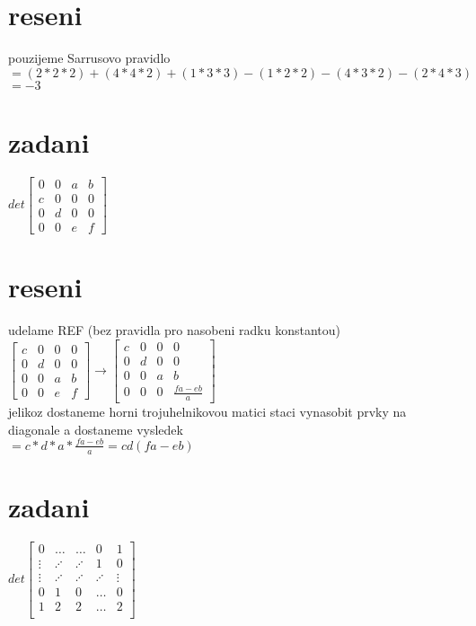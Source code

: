 \documentclass[a4paper]{article}
\begin{document}
\section*{reseni}
pouzijeme Sarrusovo pravidlo\\
$
= (2*2*2) + (4*4*2) + (1*3*3) - (1*2*2) - (4*3*2) - (2*4*3)
$\\
$= -3$



\section*{zadani}
$det
\left[ \begin{matrix} 
	0 & 0 & a & b \\
	c & 0 & 0 & 0 \\
	0 & d & 0 & 0 \\
	0 & 0 & e & f
\end{matrix} \right]
$

\section*{reseni}
udelame REF (bez pravidla pro nasobeni radku konstantou)\\
$
\left[ \begin{matrix} 
	c & 0 & 0 & 0 \\
	0 & d & 0 & 0 \\
	0 & 0 & a & b \\
	0 & 0 & e & f
\end{matrix} \right]
\rightarrow
\left[ \begin{matrix} 
	c & 0 & 0 & 0 \\
	0 & d & 0 & 0 \\
	0 & 0 & a & b \\
	0 & 0 & 0 & \frac{fa-eb}{a}
\end{matrix} \right]
$\\
jelikoz dostaneme horni trojuhelnikovou matici staci
vynasobit prvky na diagonale a dostaneme vysledek\\
$= c*d*a*\frac{fa-eb}{a}=cd(fa-eb)$




\section*{zadani}
$det
\left[ \begin{matrix} 
	0 & \dots & \dots & 0 & 1 \\
	\vdots & \iddots & \iddots & 1 & 0 \\
	\vdots & \iddots & \iddots & \iddots & \vdots \\
	0 & 1 & 0 & \dots & 0 \\
	1 & 2 & 2 & \dots & 2 \\
\end{matrix} \right]
$
\end{document}
